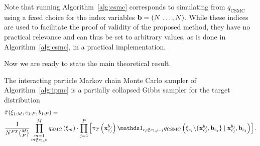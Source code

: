 Note that running Algorithm~\ref{alg:csmc} corresponds to simulating from $q_\text{CSMC}$ using a fixed
choice for the index variables $\mathbf{b} = (N\,\ldots,N)$. While these indices are used to facilitate the
proof of validity of the proposed method, they have no practical relevance and can thus be set to arbitrary
values, as is done in Algorithm~\ref{alg:csmc}, in a practical implementation.

Now we are ready to state the main theoretical result.
\begin{theorem}
	\label{thm:one}
	The interacting particle Markov chain Monte Carlo sampler of Algorithm~\ref{alg:ipmc} is a partially collapsed Gibbs sampler \citep{van2008partially} for the target distribution
	\begin{align}
	\label{eq:targetdistribution}
	&\tilde \pi(\xib_{1:M}, c_{1:P}, b_{1:P}) =  \nonumber \\
	&\frac{1}{N^{PT} \binom{M}{P}} \prod_{\substack{m=1\\m\notin c_{1:P}}}^M q_{\text{SMC}}\left(\xib_m\right) \cdot \prod_{j = 1}^P \left[ \pi_T\left(\xb_{c_j}^{b_j}\right) \iden_{c_j \notin c_{1:j-1}} 
	q_{\text{CSMC}}\left(\xib_{c_j} \backslash \{\xb_{c_j}^{b_j}, \bb_{c_j}\} \mid \xb_{c_j}^{b_j}, \bb_{c_j}\right) \right].
	\end{align}
\end{theorem}
